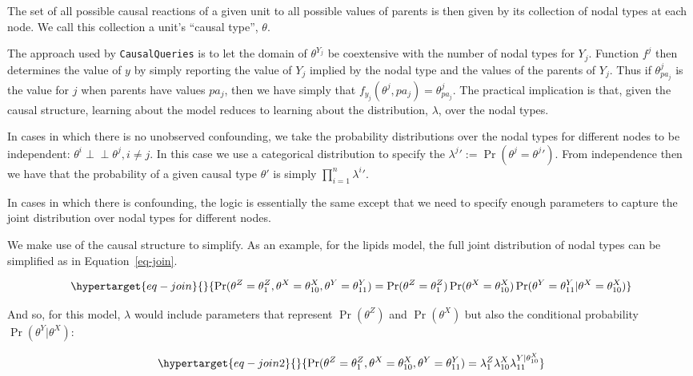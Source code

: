 \documentclass[
  11pt,
  article]{jss}
\begin{document}
The set of all possible causal reactions of a given unit to all possible
values of parents is then given by its collection of nodal types at each
node. We call this collection a unit's ``causal type'', \(\theta\).

The approach used by \texttt{CausalQueries} is to let the domain of
\(\theta^{Y_j}\) be coextensive with the number of nodal types for
\(Y_j\). Function \(f^j\) then determines the value of \(y\) by simply
reporting the value of \(Y_j\) implied by the nodal type and the values
of the parents of \(Y_j\). Thus if \(\theta^j_{pa_j}\) is the value for
\(j\) when parents have values \(pa_j\), then we have simply that
\(f_{y_j}(\theta^{j}, pa_j) = \theta^j_{pa_j}\). The practical
implication is that, given the causal structure, learning about the
model reduces to learning about the distribution, \(\lambda\), over the
nodal types.

In cases in which there is no unobserved confounding, we take the
probability distributions over the nodal types for different nodes to be
independent: \(\theta^i \perp\!\!\! \perp \theta^j, i\neq j\). In this
case we use a categorical distribution to specify the
\({\lambda^j}' := \Pr(\theta^j = {\theta^j}')\). From independence then
we have that the probability of a given causal type \(\theta'\) is
simply \(\prod_{i=1}^n {\lambda^i}'\).

In cases in which there is confounding, the logic is essentially the
same except that we need to specify enough parameters to capture the
joint distribution over nodal types for different nodes.

We make use of the causal structure to simplify. As an example, for the
lipids model, the full joint distribution of nodal types can be
simplified as in Equation~\ref{eq-join}.

\begin{equation}\protect\hypertarget{eq-join}{}{
\Pr(\theta^Z = \theta^Z_1, \theta^X = \theta^X_{10}, \theta^Y = \theta^Y_{11}) = 
\Pr(\theta^Z = \theta^Z_1)\Pr(\theta^X = \theta^X_{10})\Pr(\theta^Y = \theta^Y_{11}|\theta^X = \theta^X_{10})
}\label{eq-join}\end{equation}

And so, for this model, \(\lambda\) would include parameters that
represent \(\Pr(\theta^Z)\) and \(\Pr(\theta^X)\) but also the
conditional probability \(\Pr(\theta^Y|\theta^X)\):

\begin{equation}\protect\hypertarget{eq-join2}{}{
\Pr(\theta^Z = \theta^Z_1, \theta^X = \theta^X_{10}, \theta^Y = \theta^Y_{11}) = 
\lambda^Z_1\lambda^X_{10}\lambda^{Y|\theta^X_{10}}_{11}
}\label{eq-join2}\end{equation}
\end{document}
